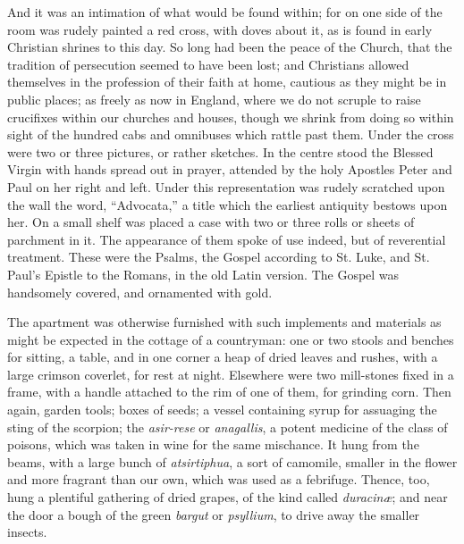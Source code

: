 And it was an intimation of what would be found within; for on one
side of the room was rudely painted a red cross, with doves about it,
as is found in early Christian shrines to this day. So long had
been the peace of the Church, that the tradition of persecution seemed
to have been lost; and Christians allowed themselves in the profession
of their faith at home, cautious as they might be in public places; as
freely as now in England, where we do not scruple to raise crucifixes
within our churches and houses, though we shrink from doing so within
sight of the hundred cabs and omnibuses which rattle past them. Under
the cross were two or three pictures, or rather sketches. In the
centre stood the Blessed Virgin with hands spread out in prayer,
attended by the holy Apostles Peter and Paul on her right and left.
Under this representation was rudely scratched upon the wall the word,
``Advocata,'' a title which the earliest antiquity bestows
upon her. On a small shelf was placed a case with two or three rolls
or sheets of parchment in it. The appearance of them spoke of use
indeed, but of reverential treatment. These were the Psalms, the
Gospel according to St. Luke, and St. Paul's Epistle to the Romans, in
the old Latin version. The Gospel was handsomely covered, and
ornamented with gold.

The apartment was otherwise furnished with such implements and
materials as might be expected in the cottage of a countryman: one or
two stools and benches for sitting, a table, and in one corner a heap
of dried leaves and rushes, with a large crimson coverlet, for rest at
night. Elsewhere were two mill-stones fixed in a frame, with a handle
attached to the rim of one of them, for grinding corn. Then
again, garden tools; boxes of seeds; a vessel containing syrup for
assuaging the sting of the scorpion; the \emph{asir-rese} or \emph{anagallis},
a potent medicine of the class of poisons, which was taken in wine for
the same mischance. It hung from the beams, with a large bunch of \emph{atsirtiphua},
a sort of camomile, smaller in the flower and more fragrant than our
own, which was used as a febrifuge. Thence, too, hung a plentiful
gathering of dried grapes, of the kind called \emph{duracinæ}; and
near the door a bough of the green \emph{bargut} or \emph{psyllium},
to drive away the smaller insects.

